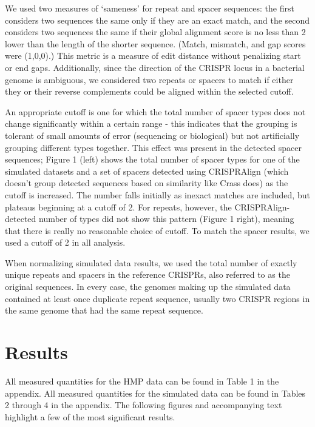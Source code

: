 \documentclass{bmcart}
\begin{document}
We used two measures of ‘sameness’ for repeat and spacer sequences: the first considers two sequences the same only if they are an exact match, and the second considers two sequences the same if their global alignment score is no less than 2 lower than the length of the shorter sequence. (Match, mismatch, and gap scores were (1,0,0).) This metric is a measure of edit distance without penalizing start or end gaps. Additionally, since the direction of the CRISPR locus in a bacterial genome is ambiguous, we considered two repeats or spacers to match if either they or their reverse complements could be aligned within the selected cutoff.
 
An appropriate cutoff is one for which the total number of spacer types does not change significantly within a certain range - this indicates that the grouping is tolerant of small amounts of error (sequencing or biological) but not artificially grouping different types together. This effect was present in the detected spacer sequences; Figure 1 (left) shows the total number of spacer types for one of the simulated datasets and a set of spacers detected using CRISPRAlign (which doesn’t group detected sequences based on similarity like Crass does) as the cutoff is increased. The number falls initially as inexact matches are included, but plateaus beginning at a cutoff of 2. For repeats, however, the CRISPRAlign-detected number of types did not show this pattern (Figure 1 right), meaning that there is really no reasonable choice of cutoff. To match the spacer results, we used a cutoff of 2 in all analysis.

When normalizing simulated data results, we used the total number of exactly unique repeats and spacers in the reference CRISPRs, also referred to as the original sequences. In every case, the genomes making up the simulated data contained at least once duplicate repeat sequence, usually two CRISPR regions in the same genome that had the same repeat sequence.  

\section*{Results}
All measured quantities for the HMP data can be found in Table 1 in the appendix. All measured quantities for the simulated data can be found in Tables 2 through 4 in the appendix. The following figures and accompanying text highlight a few of the most significant results. 
 
\end{document}
